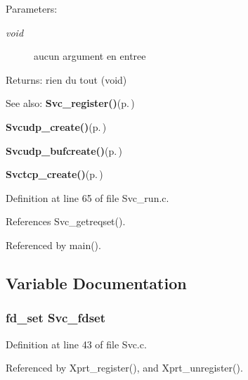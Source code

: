 \begin{Desc}
\item[Parameters:]
\begin{description}
\item[{\em void}]aucun argument en entree\end{description}
\end{Desc}
\begin{Desc}
\item[Returns:]rien du tout (void)\end{Desc}
\begin{Desc}
\item[See also:]{\bf Svc\_\-register()}{\rm (p.\,\pageref{Svc_8c_a10})} 

{\bf Svcudp\_\-create()}{\rm (p.\,\pageref{Svc__udp_8c_a11})} 

{\bf Svcudp\_\-bufcreate()}{\rm (p.\,\pageref{Svc__udp_8c_a10})} 

{\bf Svctcp\_\-create()}{\rm (p.\,\pageref{Svc__tcp_8c_a14})} \end{Desc}


Definition at line 65 of file Svc\_\-run.c.

References Svc\_\-getreqset().

Referenced by main().

\subsection{Variable Documentation}
\subsubsection{\setlength{\rightskip}{0pt plus 5cm}fd\_\-set {\bf Svc\_\-fdset}}\label{Svc__run_8c_a0}




Definition at line 43 of file Svc.c.

Referenced by Xprt\_\-register(), and Xprt\_\-unregister().